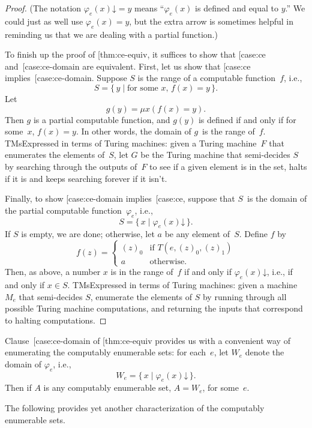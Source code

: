 \documentclass[10pt,a4paper]{article}
\makeatletter
\theoremstyle{plain}
\theoremstyle{definition}
\theoremstyle{remark}
\newcommand{\olref}{\@ifnextchar[{\olref@i}{\olref@final}}
\def\olref@i[#1]{\@ifnextchar[{\olref@ii}{\olref@final}}
\def\olref@ii[#1]{\@ifnextchar[{\olref@iii}{\olref@final}}
\def\olref@iii[#1]{\olref@final}
\def\olref@final#1{\ref{#1}}
\providecommand{\cfind}[1]{\varphi_{#1}}
\providecommand{\iftag}[1]{#1}
\providecommand{\fdefined}{\mathord{\downarrow}}
\providecommand{\Setabs}[2]{\{\, #1 \mid #2 \,\}}
\providecommand{\umin}{\mu}
\providecommand{\iftag}{}
\makeatother
\begin{document}
\begin{proof}
(The notation $\cfind{e}(x) \fdefined = y$ means ``$\cfind{e}(x)$ is
defined and equal to $y$.'' We could just as well use $\cfind{e}(x) =
y$, but the extra arrow is sometimes helpful in reminding us that we
are dealing with a partial function.)

To finish up the proof of \olref{thm:ce-equiv}, it suffices to show
that \olref{case:ce} and~\olref{case:ce-domain} are equivalent. First,
let us show that \olref{case:ce} implies~\olref{case:ce-domain}.
Suppose $S$ is the range of a computable function~$f$, i.e.,
\[
S = \Setabs{y}{\text{for some $x$, } f(x) = y}.
\]
Let
\[
g(y) = \umin{x}{(f(x) = y)}.
\]
Then $g$ is a partial computable function, and $g(y)$ is defined if
and only if for some~$x$, $f(x) = y$. In other words, the domain of
$g$~is the range of~$f$. \iftag{TMs}{Expressed in terms of Turing
machines: given a Turing machine~$F$ that enumerates the elements
of~$S$, let $G$ be the Turing machine that semi-decides $S$ by
searching through the outputs of~$F$ to see if a given element is in
the set, halts if it is and keeps searching forever if it isn't.}{}

Finally, to show \olref{case:ce-domain} implies~\olref{case:ce},
suppose that $S$~is the domain of the partial computable
function~$\cfind{e}$, i.e.,
\[
S = \Setabs{x}{\cfind{e}(x) \fdefined}.
\]
If $S$ is empty, we are done; otherwise, let $a$ be any element
of~$S$. Define $f$ by
\[
f(z) = \begin{cases}
(z)_0 & \text{if $T(e,(z)_0,(z)_1)$} \\
a & \text{otherwise.}
\end{cases}
\]
Then, as above, a number $x$ is in the range of~$f$ if and only if
$\cfind{e}(x) \fdefined$, i.e., if and only if $x \in S$. \iftag{TMs}{Expressed
in terms of Turing machines: given a machine $M_e$ that semi-decides
$S$, enumerate the elements of $S$ by running through all possible
Turing machine computations, and returning the inputs that correspond
to halting computations.}{}
\end{proof}

Clause~\olref{case:ce-domain} of \olref{thm:ce-equiv} provides us with
a convenient way of enumerating the computably enumerable sets: for
each~$e$, let $W_e$ denote the domain of $\cfind{e}$, i.e.,
\[
W_e = \Setabs{x}{\cfind{e}(x) \fdefined}.
\] 
Then if $A$ is any computably enumerable set, $A = W_e$, for some~$e$.

The following provides yet another characterization of the computably
enumerable sets.
\end{document}
